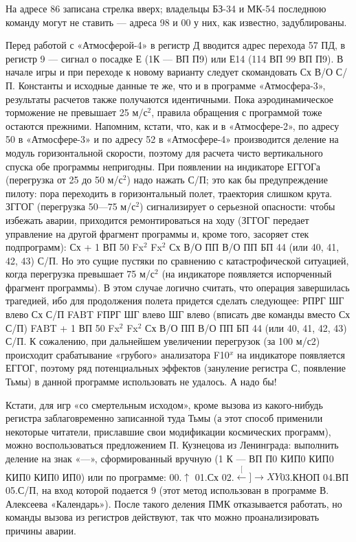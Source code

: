\documentclass[11pt,a4paper,oneside]{article}
\def\XY{$\stackrel[\leftarrow]{\rightarrow}{XY}$}
\begin{document}
На адресе 86 записана стрелка вверх; владельцы БЗ-34 и МК-54 последнюю команду могут не ставить — адреса 98 и 00 у них, как известно, задублированы.

Перед работой с «Атмосферой-4» в регистр Д вводится адрес перехода 57 ПД, в регистр 9 — сигнал о посадке Е (1К — ВП П9) или Е14 (114 ВП 99 ВП П9). В начале игры и при переходе к новому варианту следует скомандовать Сх В/О С/П. Константы и исходные данные те же, что и в программе «Атмосфера-3», результаты расчетов также получаются идентичными. Пока аэродинамическое торможение не превышает 25 м/с$^{2}$, правила обращения с программой тоже остаются прежними. Напомним, кстати, что, как и в «Атмосфере-2», по адресу 50 в «Атмосфере-3» и по адресу 52 в «Атмосфере-4» производится деление на модуль горизонтальной скорости, поэтому для расчета чисто вертикального спуска обе программы непригодны. При появлении на индикаторе ЕГГОГа (перегрузка от 25 до 50 м/с$^{2}$) надо нажать С/П; это как бы предупреждение пилоту: пора переходить в горизонтальный полет, траектория слишком крута. ЗГГОГ (перегрузка 50—75 м/с$^{2}$) сигнализирует о серьезной опасности: чтобы избежать аварии, приходится ремонтироваться на ходу (ЗГГОГ передает управление на другой фрагмент программы и, кроме того, засоряет стек подпрограмм): Сх + 1 ВП 50 Fx$^{2}$ Fx$^{2}$ Сх В/О ПП В/О ПП БП 44 (или 40, 41, 42, 43) С/П. Но это сущие пустяки по сравнению с катастрофической ситуацией, когда перегрузка превышает 75 м/с$^{2}$ (на индикаторе появляется испорченный фрагмент программы). В этом случае логично считать, что операция завершилась трагедией, ибо для продолжения полета придется сделать следующее: РПРГ ШГ влево Сх С/П FABT FПРГ ШГ влево ШГ влево (вписать две команды вместо Сх С/П) FABT + 1 ВП 50 Fx$^{2}$ Fx$^{2}$ Сх В/О ПП В/О ПП БП 44 (или 40, 41, 42, 43) С/П. К сожалению, при дальнейшем увеличении перегрузок (за 100	м/с2) происходит срабатывание «грубого» анализатора F10$^{x}$ на индикаторе появляется ЕГГОГ, поэтому ряд потенциальных эффектов (зануление регистра С, появление Тьмы) в данной программе использовать не удалось. А надо бы!

Кстати, для игр «со смертельным исходом», кроме вызова из какого-нибудь регистра заблаговременно записанной туда Тьмы (а этот способ применили некоторые читатели, приславшие свои модификации космических программ), можно воспользоваться предложением П. Кузнецова из Ленинграда: выполнить деление на знак «—», сформированный вручную (1 К — ВП П0 КИП0 КИП0 КИП0 КИП0 ИП0) или по программе: 00.$\uparrow$ 01.Сх 02.\XY 03.КНОП 04.ВП 05.С/П, на вход которой подается 9 (этот метод использован в программе В. Алексеева «Календарь»). После такого деления ПМК отказывается работать, но команды вызова из регистров действуют, так что можно проанализировать причины аварии.
\end{document}
